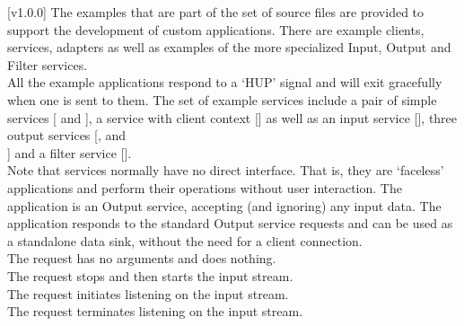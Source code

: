 [v1.0.0]
The examples that are part of the \mplusm{} set of source files are provided to support
the development of custom applications.
There are example clients, services, adapters as well as examples of the more specialized
Input, Output and Filter services.\\

All the example applications respond to a `HUP' signal and will exit gracefully when one
is sent to them.
The set of example services include a pair of simple services
[ and
], a service with client context
[] as well as an input service
[], three output services
[,
 and\\
] and a filter service
[].\\

Note that services normally have no direct interface.
That is, they are `faceless' applications and perform their operations without user
interaction.
The  application is an Output
service, accepting (and ignoring) any input data.
The application responds to the standard Output service requests and can be used as a
standalone data sink, without the need for a client connection.\\

The  request has no arguments and
does nothing.\\

The  request stops and then
starts the input stream.\\

The  request initiates listening
on the input stream.\\

The  request terminates listening
on the input stream.\\

